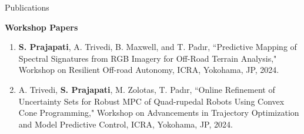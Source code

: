 \documentclass{resume}
\begin{document}
\begin{rSection}{Publications}
\begin{enumerate}[leftmargin=0.5cm]
\end{enumerate}
\vspace{-1mm}
\textbf{Workshop Papers}
\begin{enumerate}[leftmargin=0.5cm]
\item \vspace{-0.3em} \textbf{S. Prajapati}, A. Trivedi, B. Maxwell, and T. Pad{\i}r, ``Predictive Mapping of Spectral Signatures from RGB Imagery for Off-Road Terrain Analysis," Workshop on Resilient Off-road Autonomy, ICRA, Yokohama, JP, 2024.
    
    \item \vspace{-0.3em} A. Trivedi, \textbf{S. Prajapati}, M. Zolotas, T. Pad{\i}r, ``Online Refinement of Uncertainty Sets for Robust MPC of Quad-rupedal
    Robots Using Convex Cone Programming," Workshop on Advancements in Trajectory Optimization and Model Predictive Control, ICRA, Yokohama, JP, 2024.
\end{enumerate}
\end{rSection}
\end{document}
